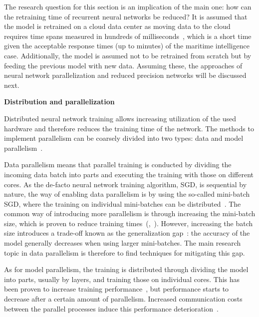The research question for this section is an implication of the main one: how can the retraining time of recurrent neural networks be reduced? It is assumed that the model is retrained on a cloud data center as moving data to the cloud requires time spans measured in hundreds of milliseconds~\cite{edgelatency}, which is a short time given the acceptable response times (up to minutes) of the maritime intelligence case. Additionally, the model is assumed not to be retrained from scratch but by feeding the previous model with new data. Assuming these, the approaches of neural network parallelization and reduced precision networks will be discussed next.

\textbf{Distribution and parallelization}

Distributed neural network training allows increasing utilization of the used hardware and therefore reduces the training time of the network. The methods to implement parallelism can be coarsely divided into two types: data and model parallelism~\cite{ben-nunDemystifyingParallelDistributed2019}.

Data parallelism means that parallel training is conducted by dividing the incoming data batch into parts and executing the training with those on different cores. As the de-facto neural network training algorithm, SGD, is sequential by nature, the way of enabling data parallelism is by using the so-called mini-batch SGD, where the training on individual mini-batches can be distributed~\cite{DBLP:conf/icml/LeNCLPN11}. The common way of introducing more parallelism is through increasing the mini-batch size, which is proven to reduce training times~(\cite{shallueMeasuringEffectsData2019},~\cite{smithDonDecayLearning2018}). However, increasing the batch size introduces a trade-off known as the generalization gap~\cite{hofferTrainLongerGeneralize2018}: the accuracy of the model generally decreases when using larger mini-batches. The main research topic in data parallelism is therefore to find techniques for mitigating this gap.
\enlargethispage{-7mm}

As for model parallelism, the training is distributed through dividing the model into parts, usually by layers, and training those on individual cores. This has been proven to increase training performance~\cite{modelparallel}, but performance starts to decrease after a certain amount of parallelism. Increased communication costs between the parallel processes induce this performance deterioration~\cite{ben-nunDemystifyingParallelDistributed2019}.


